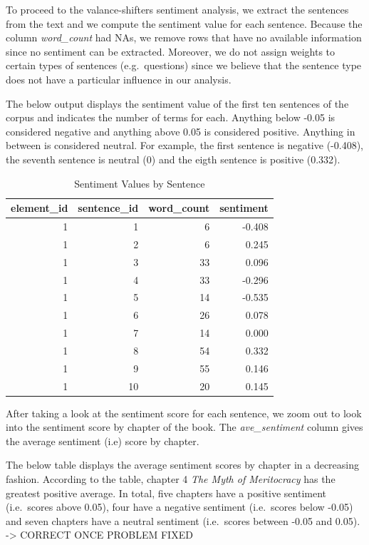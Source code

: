 \documentclass[
]{article}
\begin{document}
To proceed to the valance-shifters sentiment analysis, we extract the
sentences from the text and we compute the sentiment value for each
sentence. Because the column \emph{word\_count} had NAs, we remove rows
that have no available information since no sentiment can be extracted.
Moreover, we do not assign weights to certain types of sentences
(e.g.~questions) since we believe that the sentence type does not have a
particular influence in our analysis.

The below output displays the sentiment value of the first ten sentences
of the corpus and indicates the number of terms for each. Anything below
-0.05 is considered negative and anything above 0.05 is considered
positive. Anything in between is considered neutral. For example, the
first sentence is negative (-0.408), the seventh sentence is neutral (0)
and the eigth sentence is positive (0.332).

\begin{table}

\caption{\label{tab:sentiment analysis}Sentiment Values by Sentence}
\centering
\begin{tabular}[t]{r|r|r|r}
\hline
element\_id & sentence\_id & word\_count & sentiment\\
\hline
1 & 1 & 6 & -0.408\\
\hline
1 & 2 & 6 & 0.245\\
\hline
1 & 3 & 33 & 0.096\\
\hline
1 & 4 & 33 & -0.296\\
\hline
1 & 5 & 14 & -0.535\\
\hline
1 & 6 & 26 & 0.078\\
\hline
1 & 7 & 14 & 0.000\\
\hline
1 & 8 & 54 & 0.332\\
\hline
1 & 9 & 55 & 0.146\\
\hline
1 & 10 & 20 & 0.145\\
\hline
\end{tabular}
\end{table}

After taking a look at the sentiment score for each sentence, we zoom
out to look into the sentiment score by chapter of the book. The
\emph{ave\_sentiment} column gives the average sentiment (i.e) score by
chapter.

The below table displays the average sentiment scores by chapter in a
decreasing fashion. According to the table, chapter 4 \emph{The Myth of
Meritocracy} has the greatest positive average. In total, five chapters
have a positive sentiment (i.e.~scores above 0.05), four have a negative
sentiment (i.e.~scores below -0.05) and seven chapters have a neutral
sentiment (i.e.~scores between -0.05 and 0.05). -\textgreater{} CORRECT
ONCE PROBLEM FIXED
\end{document}
